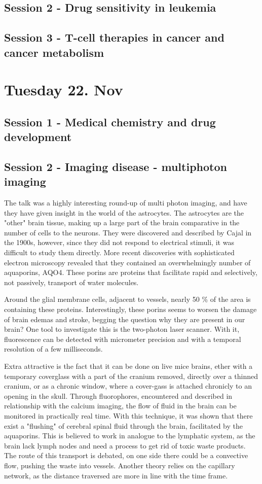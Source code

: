 \documentclass[12p]{article}
\begin{document}
\subsection*{Session 2 - Drug sensitivity in leukemia}

\subsection*{Session 3 - T-cell therapies in cancer and cancer metabolism}

\section*{Tuesday 22. Nov}
\subsection*{Session 1 - Medical chemistry and drug development}
\subsection*{Session 2 - Imaging disease - multiphoton imaging}

The talk was a highly interesting round-up of multi photon imaging, and have they have given insight in the world of the astrocytes.
The astrocytes are the "other" brain tissue, making up a large part of the brain comparative in the number of cells to the neurons.
They were discovered and described by Cajal in the 1900s, however, since they did not respond to electrical stimuli, it was difficult to study them directly.
More recent discoveries with sophisticated electron microscopy revealed that they contained an overwhelmingly number of aquaporins, AQO4.
These porins are proteins that facilitate rapid and selectively, not passively, transport of water molecules.

Around the glial membrane cells, adjacent to vessels, nearly 50 \% of the area is containing these proteins.
Interestingly, these porins seems to worsen the damage of brain edemas and stroke, begging the question why they are present in our brain?
One tool to investigate this is the two-photon laser scanner.
With it, fluorescence can be detected with micrometer precision and with a temporal resolution of a few milliseconds.

Extra attractive is the fact that it can be done on live mice brains, ether with a temporary coverglass with a part of the cranium removed, directly over a thinned cranium, or as a chronic window, where a cover-gass is attached chronicly to an opening in the skull.
Through fluorophores, encountered and described in relationship with the calcium imaging, the flow of fluid in the brain can be monitored in practically real time.
With this technique, it was shown that there exist a "flushing" of cerebral spinal fluid through the brain, facilitated by the aquaporins.
This is believed to work in analogue to the lymphatic system, as the brain lack lymph nodes and need a process to get rid of toxic waste products.
The route of this transport is debated, on one side there could be a convective flow, pushing the waste into vessels.
Another theory relies on the capillary network, as the distance traversed are more in line with the time frame.
\end{document}

